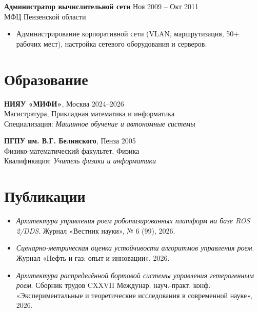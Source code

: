 \documentclass[10pt,a4paper]{article}
\begin{document}
\textbf{Администратор вычислительной сети} \hfill Ноя 2009 -- Окт 2011 \\
МФЦ Пензенской области
\begin{itemize}
    \item Администрирование корпоративной сети (VLAN, маршрутизация, 50+ рабочих мест), настройка сетевого оборудования и серверов.
\end{itemize}

\section*{Образование}
\textbf{НИЯУ «МИФИ»}, Москва \hfill 2024--2026 \\
Магистратура, Прикладная математика и информатика \\
Специализация: \textit{Машинное обучение и автономные системы}

\textbf{ПГПУ им. В.Г. Белинского}, Пенза \hfill 2005 \\
Физико-математический факультет, Физика \\
Квалификация: \textit{Учитель физики и информатики}

\section*{Публикации}
\begin{itemize}
    \item \textit{Архитектура управления роем роботизированных платформ на базе ROS 2/DDS}. Журнал «Вестник науки», № 6 (99), 2026.
    \item \textit{Сценарно-метрическая оценка устойчивости алгоритмов управления роем}. Журнал «Нефть и газ: опыт и инновации», 2026.
    \item \textit{Архитектура распределённой бортовой системы управления гетерогенным роем}. Сборник трудов CXXVII Междунар. науч.-практ. конф. «Экспериментальные и теоретические исследования в современной науке», 2026.
\end{itemize}
\end{document}
